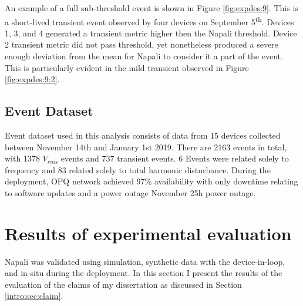 An example of a full sub-threshold event is shown in Figure \ref{fig:expdes:9}.
This is a short-lived transient event observed by four devices on September 5\textsuperscript{th}.
Devices 1, 3, and 4 generated a transient metric higher then the Napali threshold.
Device 2 transient metric did not pass threshold, yet nonetheless produced a severe enough deviation from the mean for Napali to consider it a part of the event.
This is particularly evident in the mild transient observed in Figure \ref{fig:expdes:9:2}.

\subsection{Event Dataset}\label{subsec:event-dataset}
Event dataset used in this analysis consists of data from 15 devices collected between November 14th and January 1st 2019.
There are 2163 events in total, with 1378 $V_{rms}$ events and  737 transient events.
6 Events were related solely to frequency and 83 related solely to total harmonic disturbance.
During the deployment, OPQ network achieved 97\% availability with only downtime relating to software updates and a power outage November 25h power outage.


\clearpage

\section{Results of experimental evaluation}\label{sec:napali-validation}

Napali was validated using simulation, synthetic data with the device-in-loop, and in-situ during the deployment.
In this section I present the results of the evaluation of the claims of my dissertation as discussed in Section \ref{intro:sec:claim}.


